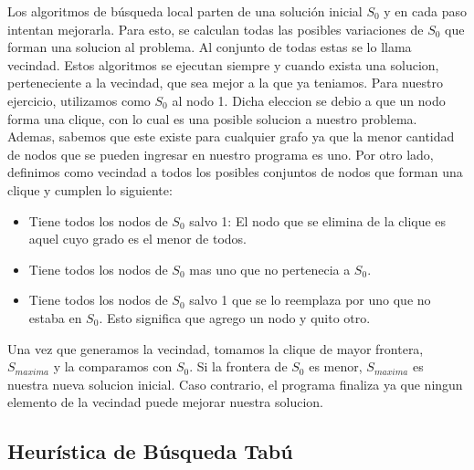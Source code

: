 Los algoritmos de búsqueda local parten de una solución inicial $S_{0}$ y en cada paso intentan mejorarla. Para esto, se calculan todas las posibles variaciones de $S_{0}$ que forman una solucion al problema. Al conjunto de todas estas se lo llama vecindad. 
Estos algoritmos se ejecutan siempre y cuando exista una solucion, perteneciente a la vecindad, que sea mejor a la que ya teniamos. \newline \newline
Para nuestro ejercicio, utilizamos como $S_{0}$ al nodo 1. Dicha eleccion se debio a que un nodo forma una clique, con lo cual es una posible solucion a nuestro problema. Ademas, sabemos que este existe para cualquier grafo ya que la menor cantidad de nodos que se pueden ingresar en nuestro programa es uno. Por otro lado, definimos como vecindad a todos los posibles conjuntos de nodos que forman una clique y cumplen lo siguiente:
\begin{itemize}
\item Tiene todos los nodos de $S_{0}$ salvo 1: \newline El nodo que se elimina de la clique es aquel cuyo grado es el menor de todos. 
\item Tiene todos los nodos de $S_{0}$ mas uno que no pertenecia a $S_{0}$.
\item Tiene todos los nodos de $S_{0}$ salvo 1 que se lo reemplaza por uno que no estaba en $S_{0}$. Esto significa que agrego un nodo y quito otro.
\end{itemize}
Una vez que generamos la vecindad, tomamos la clique de mayor frontera, $S_{maxima}$ y la comparamos con $S_{0}$. Si la frontera de $S_{0}$ es menor, $S_{maxima}$ es nuestra nueva solucion inicial. Caso contrario, el programa finaliza ya que ningun elemento de la vecindad puede mejorar nuestra solucion.





\subsection{Heurística de Búsqueda Tabú}


